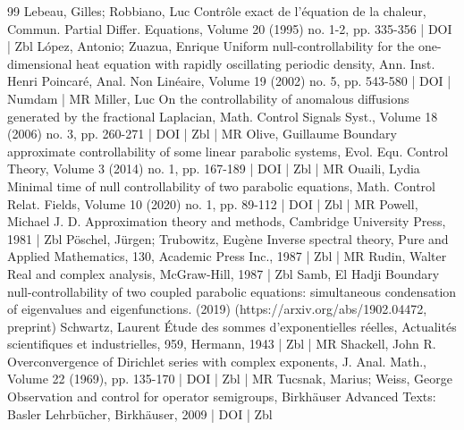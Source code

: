 \begin{thebibliography}{99}
Lebeau, Gilles; Robbiano, Luc Contrôle exact de l’équation de la chaleur, Commun. Partial Differ. Equations, Volume 20 (1995) no. 1-2, pp. 335-356 | DOI | Zbl
López, Antonio; Zuazua, Enrique Uniform null-controllability for the one-dimensional heat equation with rapidly oscillating periodic density, Ann. Inst. Henri Poincaré, Anal. Non Linéaire, Volume 19 (2002) no. 5, pp. 543-580 | DOI | Numdam | MR
Miller, Luc On the controllability of anomalous diffusions generated by the fractional Laplacian, Math. Control Signals Syst., Volume 18 (2006) no. 3, pp. 260-271 | DOI | Zbl | MR
Olive, Guillaume Boundary approximate controllability of some linear parabolic systems, Evol. Equ. Control Theory, Volume 3 (2014) no. 1, pp. 167-189 | DOI | Zbl | MR
Ouaili, Lydia Minimal time of null controllability of two parabolic equations, Math. Control Relat. Fields, Volume 10 (2020) no. 1, pp. 89-112 | DOI | Zbl | MR
Powell, Michael J. D. Approximation theory and methods, Cambridge University Press, 1981 | Zbl
Pöschel, Jürgen; Trubowitz, Eugène Inverse spectral theory, Pure and Applied Mathematics, 130, Academic Press Inc., 1987 | Zbl | MR
Rudin, Walter Real and complex analysis, McGraw-Hill, 1987 | Zbl
Samb, El Hadji Boundary null-controllability of two coupled parabolic equations: simultaneous condensation of eigenvalues and eigenfunctions. (2019) (https://arxiv.org/abs/1902.04472, preprint)
Schwartz, Laurent Étude des sommes d’exponentielles réelles, Actualités scientifiques et industrielles, 959, Hermann, 1943 | Zbl | MR
Shackell, John R. Overconvergence of Dirichlet series with complex exponents, J. Anal. Math., Volume 22 (1969), pp. 135-170 | DOI | Zbl | MR
Tucsnak, Marius; Weiss, George Observation and control for operator semigroups, Birkhäuser Advanced Texts: Basler Lehrbücher, Birkhäuser, 2009 | DOI | Zbl
\end{thebibliography}
